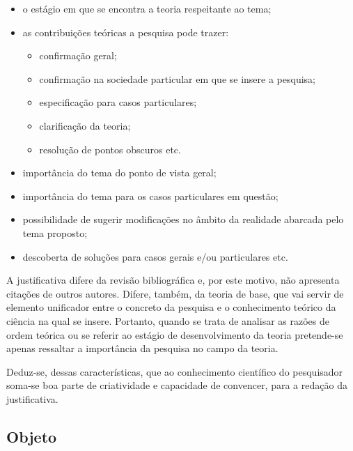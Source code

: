 \documentclass[
	12pt,				%
    oneside,			%
	a4paper,			%
	english,			%
	french,				%
	spanish,			%
	brazil				%
	]{abntex2}
\begin{document}
\begin{itemize}
    \item o estágio em que se encontra a teoria respeitante ao
    tema;

    \item as contribuições teóricas a pesquisa pode trazer:
    \begin{itemize}
        \item confirmação geral;

        \item confirmação na sociedade particular em que se insere
        a pesquisa;

        \item especificação para casos particulares;

        \item clarificação da teoria;

        \item resolução de pontos obscuros etc.
    \end{itemize}

    \item importância do tema do ponto de vista geral;

    \item importância do tema para os casos particulares em
    questão;

    \item possibilidade de sugerir modificações no âmbito da
    realidade abarcada pelo tema proposto;

    \item descoberta de soluções para casos gerais e/ou
    particulares etc.
\end{itemize}

A justificativa difere da revisão bibliográfica e, por este
motivo, não apresenta citações de outros autores. Difere, também,
da teoria de base, que vai servir de elemento unificador entre o
concreto da pesquisa e o conhecimento teórico da ciência na qual
se insere. Portanto, quando se trata de analisar as razões de
ordem teórica ou se referir ao estágio de desenvolvimento da
teoria pretende-se apenas ressaltar a importância da pesquisa no
campo da teoria.

Deduz-se, dessas características, que ao conhecimento científico
do pesquisador soma-se boa parte de criatividade e capacidade de
convencer, para a redação da justificativa.

\subsection{Objeto}
\end{document}
